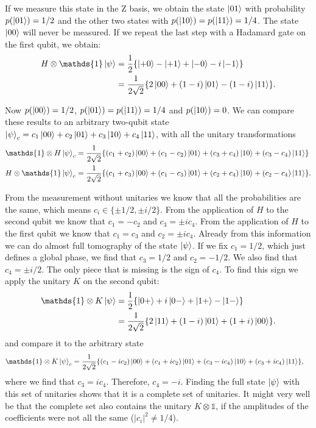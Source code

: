 \documentclass[submission, Phys]{SciPost}
\begin{document}
If we measure this state in the Z basis, we obtain the state $\ket{01}$ with probability $p(\ket{01}) = 1/2$
and the other two states with $p(\ket{10}) = p(\ket{11}) = 1/4$.
The state $\ket{00}$ will never be measured. If we repeat the last step with a Hadamard gate on the first qubit, we obtain:
\begin{align}
	H \otimes \mathds{1} \ket{\psi} & = \frac{1}{2} \{ \ket{+0} - \ket{+1} + \ket{-0} - i \ket{-1} \}          \\
	                                & = \frac{1}{2 \sqrt{2}} \{ 2 \ket{00} + (1-i)\ket{01} - (1-i)\ket{11} \}.
\end{align}

Now $p(\ket{00}) = 1/2$, $p(\ket{01}) = p(\ket{11}) = 1/4$ and $p(\ket{10}) = 0$.
We can compare these results to an arbitrary two-qubit state $\ket{\psi}_c = c_1 \ket{00} +c_2 \ket{01} + c_3 \ket{10} +c_4 \ket{11}$,
with all the unitary transformations
\begin{align}
	\mathds{1} \otimes H \ket{\psi}_c & = \frac{1}{2\sqrt{2}} \{ (c_1+c_2) \ket{00} + (c_1 -c_2)\ket{01} + (c_3 + c_4)\ket{10} + (c_3-c_4)\ket{11} \}  \\
	H \otimes \mathds{1} \ket{\psi}_c & = \frac{1}{2\sqrt{2}} \{ (c_1+c_3) \ket{00} + (c_1 -c_3)\ket{01} + (c_2 + c_4)\ket{10} + (c_2-c_4)\ket{11} \}.
\end{align}

From the measurement without unitaries we know that all the probabilities are the same,
which means $c_i \in \{ \pm 1/2, \pm i/2 \}$.
From the application of $H$ to the second qubit we know that $c_1 = -c_2$ and $c_3 = \pm i c_4$.
From the application of $H$ to the first qubit we know that $c_1 = c_3$ and $c_2 = \pm i c_4$.
Already from this information we can do almost full tomography of the state $\ket{\psi}$.
If we fix $c_1 = 1/2$, which just defines a global phase, we find that $c_3 = 1/2$ and $c_2 = -1/2$.
We also find that $c_4 = \pm i/2$.
The only piece that is missing is the sign of $c_4$. To find this sign we apply the unitary $K$ on the second qubit:
\begin{align}
	\mathds{1} \otimes K \ket{\psi} & = \frac{1}{2} \{ \ket{0+} +i \ket{0-} + \ket{1+} - \ket{1-} \}           \\
	                                & = \frac{1}{2 \sqrt{2}} \{ 2 \ket{11} + (1-i)\ket{01} + (1+i)\ket{00} \}.
\end{align}
%
and compare it to the arbitrary state
%
\begin{align}
	\mathds{1} \otimes K \ket{\psi}_c & = \frac{1}{2\sqrt{2}} \{ (c_1-ic_2) \ket{00} + (c_1 +ic_2)\ket{01} + (c_3 -ic_4)\ket{10} + (c_3+ic_4)\ket{11} \},
\end{align}
%
where we find that $c_3 = ic_4$. Therefore, $c_4 = -i$.
Finding the full state $\ket{\psi}$ with this set of unitaries shows that it is a complete set of unitaries.
It might very well be that the complete set also contains the unitary $K \otimes \mathds{1}$,
if the amplitudes of the coefficients were not all the same ($|c_i|^2 \neq 1/4$).
\end{document}
